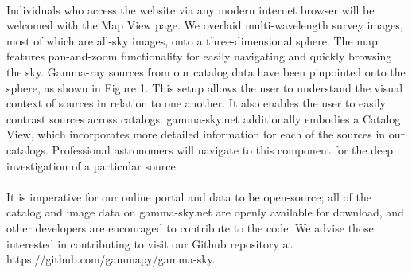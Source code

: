 \paragraph{}    Individuals who access the website via any modern internet browser will be welcomed with the Map View page.
    We overlaid multi-wavelength survey images, most of which are all-sky images, onto a three-dimensional sphere.
    The map features pan-and-zoom functionality for easily navigating and quickly browsing the sky. Gamma-ray sources from
    our catalog data have been pinpointed onto the sphere, as shown in Figure 1. This setup allows the user to understand
    the visual context of sources in relation to one another. It also enables the user to easily contrast sources across catalogs.
    gamma-sky.net additionally embodies a Catalog View, which incorporates more detailed information for each of the sources in our catalogs.
    Professional astronomers will navigate to this component for the deep investigation of a particular source. \par

\paragraph{}    It is imperative for our online portal and data to be open-source; all of the catalog and image data on gamma-sky.net are
    openly available for download, and other developers are encouraged to contribute to the code. We advise those interested
    in contributing to visit our Github repository at https://github.com/gammapy/gamma-sky. \par
